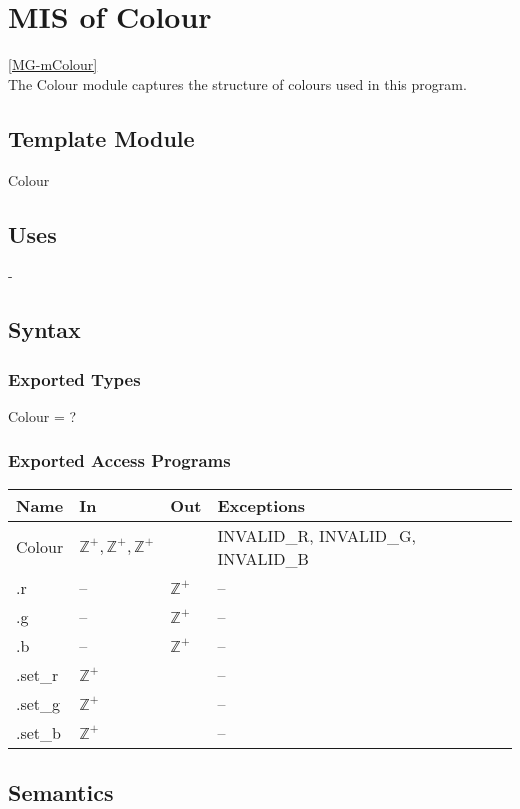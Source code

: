 \documentclass[12pt, titlepage]{article}
\begin{document}
\newpage

\section{MIS of Colour} \ref{MG-mColour} \\
The Colour module captures the structure of colours used in this program.

\subsection{Template Module}
Colour

\subsection{Uses} -

\subsection{Syntax}
\subsubsection{Exported Types}
Colour = ?

\subsubsection{Exported Access Programs}
\begin{center}
	\begin{tabular}{p{4cm} p{2cm} p{2cm} p{4cm}}
		\hline
		\textbf{Name} & \textbf{In} & \textbf{Out} & \textbf{Exceptions} \\
		\hline
		Colour & $\mathbb{Z}^+,\mathbb{Z}^+,\mathbb{Z}^+$ & & INVALID\_R, 
		INVALID\_G, INVALID\_B \\
		.r & -- & $\mathbb{Z}^+$ & -- \\
		.g & -- & $\mathbb{Z}^+$ & -- \\		
		.b & -- & $\mathbb{Z}^+$ & -- \\		%
		.set\_r & $\mathbb{Z}^+$ & & -- \\
		.set\_g & $\mathbb{Z}^+$ & & -- \\		
		.set\_b & $\mathbb{Z}^+$ & & -- \\		%
		\hline
	\end{tabular}
\end{center}

\subsection{Semantics}
\end{document}
